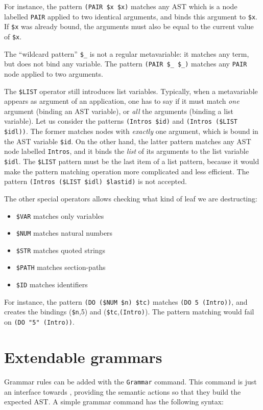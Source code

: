For instance, the pattern \verb+(PAIR $x $x)+ matches any AST which is
a node labelled {\tt PAIR} applied to two identical arguments, and
binds this argument to {\tt\$x}. If {\tt\$x} was already bound, the
arguments must also be equal to the current value of {\tt\$x}.

The ``wildcard pattern'' \verb+$_+ is not a regular metavariable: it
matches any term, but does not bind any variable. The pattern
\verb+(PAIR $_ $_)+ matches any {\tt PAIR} node applied to two
arguments.

The {\tt\$LIST} operator still introduces list variables. Typically,
when a metavariable appears as argument of an application, one has to
say if it must match \emph{one} argument (binding an AST variable), or
\emph{all} the arguments (binding a list variable). Let us consider
the patterns \verb+(Intros $id)+ and \verb+(Intros ($LIST $idl))+. The
former matches nodes with \emph{exactly} one argument, which is bound
in the AST variable {\tt\$id}. On the other hand, the latter pattern
matches any AST node labelled {\tt Intros}, and it binds the
\emph{list} of its arguments to the list variable {\tt\$idl}. The
{\tt\$LIST} pattern must be the last item of a list pattern, because
it would make the pattern matching operation more complicated and less
efficient. The pattern \verb+(Intros ($LIST $idl) $lastid)+ is not
accepted.

The other special operators allows checking what kind of leaf we
are destructing:
\begin{itemize}
\item{\tt\$VAR} matches only variables
\item{\tt\$NUM} matches natural numbers
\item{\tt\$STR} matches quoted strings
\item{\tt\$PATH} matches section-paths
\item{\tt\$ID} matches identifiers
\end{itemize}
\noindent For instance, the pattern \verb+(DO ($NUM $n) $tc)+ matches
\verb+(DO 5 (Intro))+, and creates the bindings ({\tt\$n},5) and
({\tt\$tc},\verb+(Intro)+). The pattern matching would fail on
\verb+(DO "5" (Intro))+.

\section{Extendable grammars}
\label{Grammar}

Grammar rules can be added with the {\tt Grammar} command. This
command is just an interface towards {\camlpppp}, providing the
semantic actions so that they build the expected AST. A simple grammar
command has the following syntax: 


